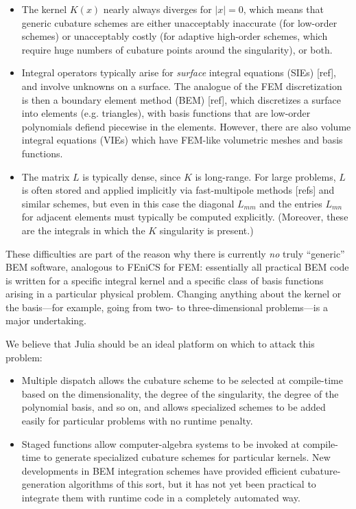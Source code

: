 \begin{itemize}

\item The kernel $K(x)$ nearly always diverges for $|x|=0$, which means that generic cubature schemes are either unacceptably inaccurate (for low-order schemes) or unacceptably costly (for adaptive high-order schemes, which require huge numbers of cubature points around the singularity), or both.

\item Integral operators typically arise for \emph{surface} integral
  equations (SIEs) [ref], and involve unknowns on a surface.  The
  analogue of the FEM discretization is then a boundary element method
  (BEM) [ref], which discretizes a surface into elements
  (e.g. triangles), with basis functions that are low-order
  polynomials defiend piecewise in the elements.  However, there are
  also volume integral equations (VIEs) which have FEM-like volumetric
  meshes and basis functions.

\item The matrix $L$ is typically dense, since $K$ is long-range.  For
  large problems, $L$ is often stored and applied implicitly via
  fast-multipole methods [refs] and similar schemes, but even in this
  case the diagonal $L_{mm}$ and the entries $L_{mn}$ for adjacent
  elements must typically be computed explicitly.  (Moreover, these
  are the integrals in which the $K$ singularity is present.)

\end{itemize}

These difficulties are part of the reason why there is currently \emph{no}
truly ``generic'' BEM software, analogous to FEniCS for FEM: essentially
all practical BEM code is written for a specific integral kernel and
a specific class of basis functions arising in a particular physical problem.
Changing anything about the kernel or the basis---for example, going
from two- to three-dimensional problems---is a major undertaking.

We believe that Julia should be an ideal platform on which to attack this
problem:

\begin{itemize}

\item Multiple dispatch allows the cubature scheme to be selected at compile-time based on the dimensionality, the degree of the singularity, the degree of the polynomial basis, and so on, and allows specialized schemes to be added easily for particular problems with no runtime penalty.

\item Staged functions allow computer-algebra systems to be invoked at
  compile-time to generate specialized cubature schemes for particular
  kernels.  New developments in BEM integration schemes \cite{ReidWhJo14} have
  provided efficient cubature-generation algorithms of this sort, but it
  has not yet been practical to integrate them with runtime code in
  a completely automated way.

\end{itemize}

